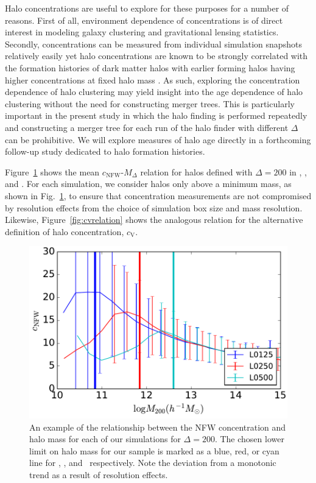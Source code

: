 \documentclass[usenatbib,usegraphicx,letterpaper]{mn2e}
\begin{document}
Halo concentrations are useful to explore for these purposes for a number of reasons. First of all, environment
dependence of concentrations is of direct interest in modeling galaxy clustering and gravitational lensing
statistics. Secondly, concentrations can be measured from individual simulation snapshots relatively easily yet
halo concentrations are known to be strongly correlated with the formation histories of dark matter halos with
earlier forming halos having higher concentrations at fixed halo mass \citep{wechsler02, wechsler06} 
. As such, exploring the concentration dependence of halo
clustering may yield insight into the age dependence of halo clustering without the need for constructing merger
trees. This is particularly important in the present study in which the halo finding is performed repeatedly and
constructing a merger tree for each run of the halo finder with different $\Delta$ can be prohibitive. We will
explore measures of halo age directly in a forthcoming follow-up study dedicated to halo formation histories.

Figure~\ref{fig:cnfwrelation} shows the mean $c_{\mathrm{NFW}}$-$M_{\Delta}$ relation for halos defined with
$\Delta=200$ in \simA, \simB, and \simC. For each simulation, we consider halos only above a minimum mass, as
shown in Fig.~\ref{fig:cnfwrelation}, to ensure that concentration measurements are not compromised by resolution
effects from the choice of simulation box size and mass resolution. Likewise, Figure~\ref{fig:cvrelation} shows
the analogous relation for the alternative definition of halo concentration, $c_{\mathrm{V}}$.

\begin{figure}
\centering
\includegraphics[width=.5\textwidth]{masscut_cNFW_d200.pdf}
\caption{An example of the relationship between the NFW concentration and halo mass for each of our simulations for $\Delta =200$. The chosen lower limit on halo mass for our sample is marked as a blue, red, or cyan line for \simA, \simB, and \simC \ respectively. Note the deviation from a monotonic trend as a result of resolution effects.}
\label{fig:cnfwrelation}
\end{figure}
\end{document}
